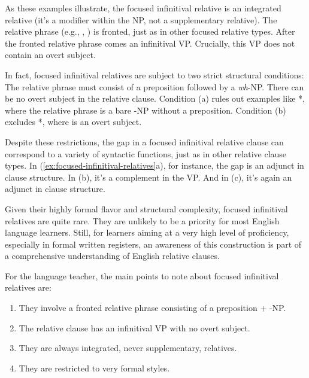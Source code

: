 \begin{samepage}
    \ea \label{ex:focused-infinitival-relatives}
        \z
    \z
\end{samepage}

As these examples illustrate, the focused infinitival relative is an integrated relative (it's a modifier within the NP, not a supplementary relative). The relative phrase (e.g., , ) is fronted, just as in other focused relative types. After the fronted relative phrase comes an infinitival VP. Crucially, this VP does not contain an overt subject.

In fact, focused infinitival relatives are subject to two strict structural conditions:
\ea \label{ex:focused-infinitival-restrictions}
    \ea  The relative phrase must consist of a preposition followed by a \emph{wh}-NP.
    \ex  There can be no overt subject in the relative clause.
    \z
\z
Condition (a) rules out examples like *, where the relative phrase is a bare -NP without a preposition. Condition (b) excludes *, where  is an overt subject.

Despite these restrictions, the gap in a focused infinitival relative clause can correspond to a variety of syntactic functions, just as in other relative clause types. In (\ref{ex:focused-infinitival-relatives}a), for instance, the gap is an adjunct in clause structure. In (b), it's a complement in the  VP. And in (c), it's again an adjunct in clause structure.

Given their highly formal flavor and structural complexity, focused infinitival relatives are quite rare. They are unlikely to be a priority for most English language learners. Still, for learners aiming at a very high level of proficiency, especially in formal written registers, an awareness of this construction is part of a comprehensive understanding of English relative clauses.

For the language teacher, the main points to note about focused infinitival relatives are:

\begin{enumerate}[noitemsep]
    \item They involve a fronted relative phrase consisting of a preposition + -NP.
    \item The relative clause has an infinitival VP with no overt subject.
    \item They are always integrated, never supplementary, relatives.
    \item They are restricted to very formal styles.
\end{enumerate}

